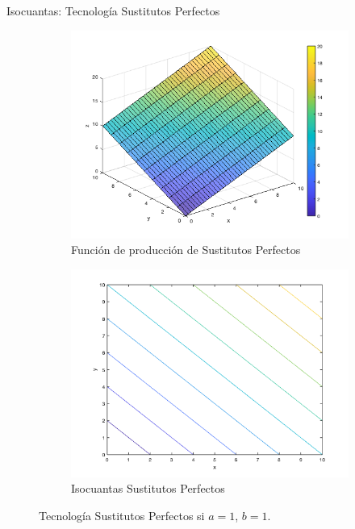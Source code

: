 \documentclass{beamer}
\theoremstyle{definition}
\begin{document}
\begin{frame}{Isocuantas: Tecnología Sustitutos Perfectos}
    \begin{figure}
\centering
\begin{subfigure}{.5\textwidth}
  \centering
  \includegraphics[width=1\linewidth]{figures2/substitutes3d.png}
  \caption{Función de producción de Sustitutos Perfectos}
  \label{fig:sub1S}
\end{subfigure}%
\begin{subfigure}{.5\textwidth}
  \centering
  \includegraphics[width=1\linewidth]{figures2/substituteslevel.png}
  \caption{Isocuantas Sustitutos Perfectos}
  \label{fig:sub2S}
\end{subfigure}
\caption{Tecnología Sustitutos Perfectos si $a=1$, $b=1$.}
\label{fig:testS}
\end{figure}
\end{frame}
\end{document}
